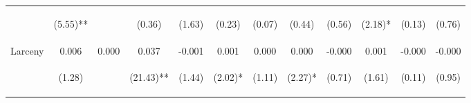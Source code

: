 \begin{tabular}{lccccccccccc}
 & \begin{footnotesize}(5.55)**\end{footnotesize} & \begin{footnotesize}\end{footnotesize} & \begin{footnotesize}(0.36)\end{footnotesize} & \begin{footnotesize}(1.63)\end{footnotesize} & \begin{footnotesize}(0.23)\end{footnotesize} & \begin{footnotesize}(0.07)\end{footnotesize} & \begin{footnotesize}(0.44)\end{footnotesize} & \begin{footnotesize}(0.56)\end{footnotesize} & \begin{footnotesize}(2.18)*\end{footnotesize} & \begin{footnotesize}(0.13)\end{footnotesize} & \begin{footnotesize}(0.76)\end{footnotesize}\\
\noalign{\smallskip}Larceny & 0.006 & 0.000 & 0.037 & -0.001 & 0.001 & 0.000 & 0.000 & -0.000 & 0.001 & -0.000 & -0.000\\
 & \begin{footnotesize}(1.28)\end{footnotesize} & \begin{footnotesize}\end{footnotesize} & \begin{footnotesize}(21.43)**\end{footnotesize} & \begin{footnotesize}(1.44)\end{footnotesize} & \begin{footnotesize}(2.02)*\end{footnotesize} & \begin{footnotesize}(1.11)\end{footnotesize} & \begin{footnotesize}(2.27)*\end{footnotesize} & \begin{footnotesize}(0.71)\end{footnotesize} & \begin{footnotesize}(1.61)\end{footnotesize} & \begin{footnotesize}(0.11)\end{footnotesize} & \begin{footnotesize}(0.95)\end{footnotesize}\\

\end{tabular}
